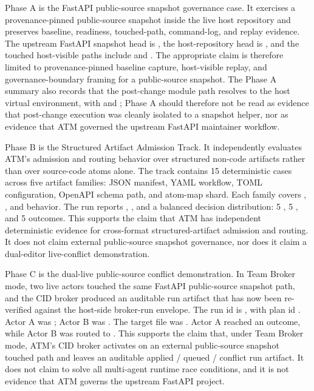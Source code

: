 \documentclass[9pt,letterpaper]{extarticle}
\begin{document}
Phase A is the FastAPI public-source snapshot governance case. It exercises a provenance-pinned public-source snapshot inside the live host repository and preserves baseline, readiness, touched-path, command-log, and replay evidence. The upstream FastAPI snapshot head is \texttt{}, the host-repository head is \texttt{}, and the touched host-visible paths include \texttt{} and \texttt{}. The appropriate claim is therefore limited to provenance-pinned baseline capture, host-visible replay, and governance-boundary framing for a public-source snapshot. The Phase A summary also records that the post-change module path resolves to the host virtual environment, with \texttt{} and \texttt{}; Phase A should therefore not be read as evidence that post-change execution was cleanly isolated to a snapshot helper, nor as evidence that ATM governed the upstream FastAPI maintainer workflow.

Phase B is the Structured Artifact Admission Track. It independently evaluates ATM's admission and routing behavior over structured non-code artifacts rather than over source-code atoms alone. The track contains 15 deterministic cases across five artifact families: JSON manifest, YAML workflow, TOML configuration, OpenAPI schema path, and atom-map shard. Each family covers \texttt{}, \texttt{}, and \texttt{} behavior. The run reports \texttt{}, \texttt{}, and a balanced decision distribution: 5 \texttt{}, 5 \texttt{}, and 5 \texttt{} outcomes. This supports the claim that ATM has independent deterministic evidence for cross-format structured-artifact admission and routing. It does not claim external public-source snapshot governance, nor does it claim a dual-editor live-conflict demonstration.

Phase C is the dual-live public-source conflict demonstration. In Team Broker mode, two live actors touched the same FastAPI public-source snapshot path, and the CID broker produced an auditable run artifact that has now been re-verified against the host-side broker-run envelope. The run id is \texttt{}, with plan id \texttt{}. Actor A was \texttt{}; Actor B was \texttt{}. The target file was \texttt{}. Actor A reached an \texttt{} outcome, while Actor B was routed to \texttt{}. This supports the claim that, under Team Broker mode, ATM's CID broker activates on an external public-source snapshot touched path and leaves an auditable applied / queued / conflict run artifact. It does not claim to solve all multi-agent runtime race conditions, and it is not evidence that ATM governs the upstream FastAPI project.
\end{document}
